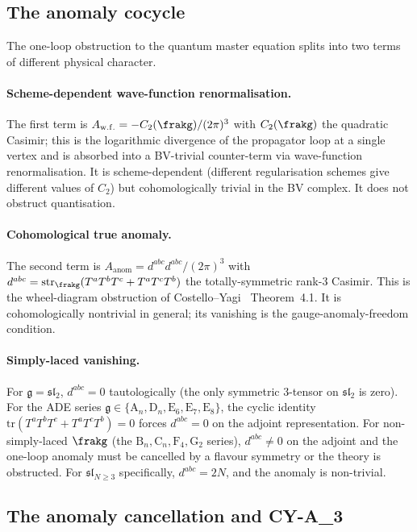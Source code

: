 \subsection*{The anomaly cocycle}

The one-loop obstruction to the quantum master equation splits into
two terms of different physical character.

\paragraph{Scheme-dependent wave-function renormalisation.}
The first term is
$A_{\mathrm{w.f.}} = -C_2(\frakg)/(2\pi)^3$ with $C_2(\frakg)$ the
quadratic Casimir; this is the logarithmic divergence of the
propagator loop at a single vertex and is absorbed into a BV-trivial
counter-term via wave-function renormalisation. It is scheme-dependent
(different regularisation schemes give different values of $C_2$) but
cohomologically trivial in the BV complex. It does not obstruct
quantisation.

\paragraph{Cohomological true anomaly.}
The second term is
$A_{\mathrm{anom}} = d^{abc}d^{abc}/(2\pi)^3$ with
$d^{abc} = \mathrm{str}_\frakg(T^a T^b T^c + T^a T^c T^b)$ the
totally-symmetric rank-$3$ Casimir. This is the wheel-diagram
obstruction of Costello--Yagi~\cite{CostelloYagi2018} Theorem~4.1. It
is cohomologically nontrivial in general; its vanishing is the
gauge-anomaly-freedom condition.

\paragraph{Simply-laced vanishing.}
For $\mathfrak{g} = \mathfrak{sl}_2$, $d^{abc} = 0$ tautologically
(the only symmetric $3$-tensor on $\mathfrak{sl}_2$ is zero). For the
ADE series $\mathfrak{g} \in \{\mathrm{A}_n, \mathrm{D}_n, \mathrm{E}_6,
\mathrm{E}_7, \mathrm{E}_8\}$, the cyclic identity
$\mathrm{tr}(T^a T^b T^c + T^a T^c T^b) = 0$ forces $d^{abc} = 0$ on
the adjoint representation. For non-simply-laced $\frakg$ (the
$\mathrm{B}_n, \mathrm{C}_n, \mathrm{F}_4, \mathrm{G}_2$ series),
$d^{abc} \ne 0$ on the adjoint and the one-loop anomaly must be
cancelled by a flavour symmetry or the theory is obstructed.
For $\mathfrak{sl}_{N\ge 3}$ specifically, $d^{abc} = 2N$, and the
anomaly is non-trivial.

\subsection*{The anomaly cancellation and CY-A_3}

